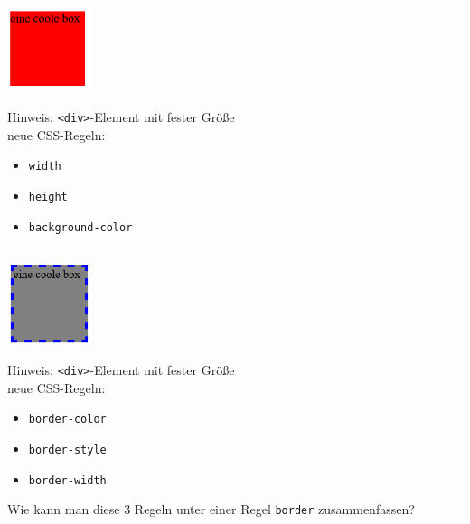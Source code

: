 \documentclass[11pt]{article}
\begin{document}
    \begin{minipage}{0.4\textwidth}
            \includegraphics[width=2.5cm]{css1} \\
    \end{minipage}
    \hspace{0.1\textwidth}
    \begin{minipage}{0.4\textwidth}
        Hinweis: \Verb"<div>"-Element mit fester Größe \\

        neue CSS-Regeln:
        \begin{itemize}
            \item \Verb"width"
            \item \Verb"height"
            \item \Verb"background-color"
        \end{itemize}
    \end{minipage}

    \vspace{0.5cm}
    \hrule
    \vspace{0.5cm}

    \begin{minipage}{0.4\textwidth}
        \includegraphics[width=2.5cm]{css2} \\
    \end{minipage}
    \hspace{0.1\textwidth}
    \begin{minipage}{0.4\textwidth}
        Hinweis: \Verb"<div>"-Element mit fester Größe \\

        neue CSS-Regeln:
        \begin{itemize}
            \item \Verb"border-color"
            \item \Verb"border-style"
            \item \Verb"border-width"
        \end{itemize}

        Wie kann man diese 3 Regeln unter einer Regel \Verb"border" zusammenfassen?
    \end{minipage}
\end{document}
